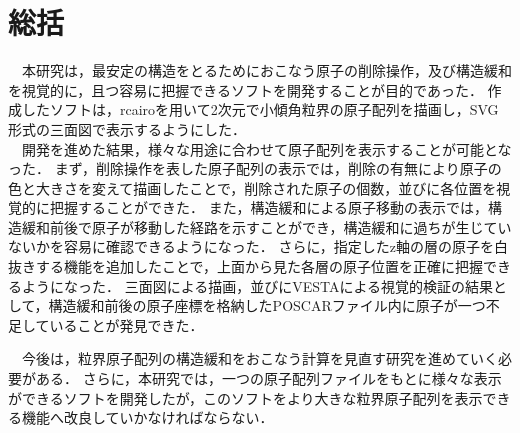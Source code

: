 \section{総括}
　本研究は，最安定の構造をとるためにおこなう原子の削除操作，及び構造緩和を視覚的に，且つ容易に把握できるソフトを開発することが目的であった．
作成したソフトは，rcairoを用いて2次元で小傾角粒界の原子配列を描画し，SVG形式の三面図で表示するようにした．\\
　開発を進めた結果，様々な用途に合わせて原子配列を表示することが可能となった．
まず，削除操作を表した原子配列の表示では，削除の有無により原子の色と大きさを変えて描画したことで，削除された原子の個数，並びに各位置を視覚的に把握することができた．
また，構造緩和による原子移動の表示では，構造緩和前後で原子が移動した経路を示すことができ，構造緩和に過ちが生じていないかを容易に確認できるようになった．
さらに，指定したz軸の層の原子を白抜きする機能を追加したことで，上面から見た各層の原子位置を正確に把握できるようになった．
三面図による描画，並びにVESTAによる視覚的検証の結果として，構造緩和前後の原子座標を格納したPOSCARファイル内に原子が一つ不足していることが発見できた．

　今後は，粒界原子配列の構造緩和をおこなう計算を見直す研究を進めていく必要がある．
さらに，本研究では，一つの原子配列ファイルをもとに様々な表示ができるソフトを開発したが，このソフトをより大きな粒界原子配列を表示できる機能へ改良していかなければならない．

